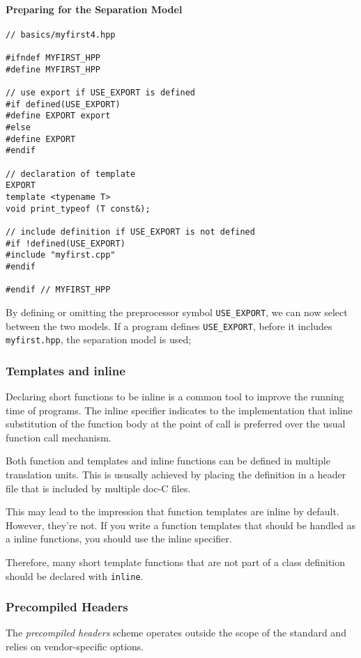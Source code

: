 \documentclass[a4paper,12pt]{book}
\begin{document}
\paragraph{Preparing for the Separation Model}
\begin{verbatim}
// basics/myfirst4.hpp 

#ifndef MYFIRST_HPP 
#define MYFIRST_HPP 

// use export if USE_EXPORT is defined 
#if defined(USE_EXPORT) 
#define EXPORT export 
#else 
#define EXPORT 
#endif 

// declaration of template 
EXPORT 
template <typename T> 
void print_typeof (T const&); 

// include definition if USE_EXPORT is not defined 
#if !defined(USE_EXPORT) 
#include "myfirst.cpp" 
#endif 

#endif // MYFIRST_HPP 
\end{verbatim}
By defining or omitting the preprocessor symbol \verb|USE_EXPORT|, we can now select between the two models. If a program defines \verb|USE_EXPORT|, before it includes \verb|myfirst.hpp|, the separation model is used;
\subsubsection{Templates and inline}
Declaring short functions to be inline is a common tool to improve the running time of programs. The inline specifier indicates to the implementation that inline substitution of the function body at the point of call is preferred over the usual function call mechanism. 

Both function and templates and inline functions can be defined in multiple translation units. This is ususally achieved by placing the definition in a header file that is included by multiple doc-C files.

This may lead to the impression that function templates are inline by default. However, they're not. If you write a function templates that should be handled as a inline functions, you should use the inline specifier. 

Therefore, many short template functions that are not part of a class definition should be declared with \verb|inline|.
\subsubsection{Precompiled Headers}
The \emph{precompiled headers} scheme operates outside the scope of the standard and relies on vendor-specific options.
\end{document}
